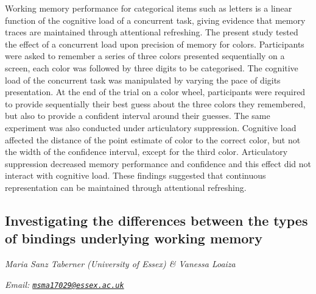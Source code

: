 \documentclass[12pt,]{book}
\begin{document}
Working memory performance for categorical items such as letters is a linear function of the cognitive load of a concurrent task, giving evidence that memory traces are maintained through attentional refreshing. The present study tested the effect of a concurrent load upon precision of memory for colors. Participants were asked to remember a series of three colors presented sequentially on a screen, each color was followed by three digits to be categorised. The cognitive load of the concurrent task was manipulated by varying the pace of digits presentation. At the end of the trial on a color wheel, participants were required to provide sequentially their best guess about the three colors they remembered, but also to provide a confident interval around their guesses. The same experiment was also conducted under articulatory suppression. Cognitive load affected the distance of the point estimate of color to the correct color, but not the width of the confidence interval, except for the third color. Articulatory suppression decreased memory performance and confidence and this effect did not interact with cognitive load. These findings suggested that continuous representation can be maintained through attentional refreshing.

\hypertarget{investigating-the-differences-between-the-types-of-bindings-underlying-working-memory}{%
\subsection{Investigating the differences between the types of bindings underlying working memory}\label{investigating-the-differences-between-the-types-of-bindings-underlying-working-memory}}

\emph{Maria Sanz Taberner (University of Essex) \& Vanessa Loaiza}

\emph{Email: \href{mailto:msma17029@essex.ac.uk}{\nolinkurl{msma17029@essex.ac.uk}}}
\end{document}
